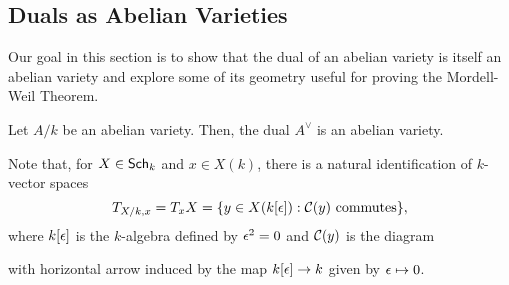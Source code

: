 \documentclass[11pt]{article}
\begin{document}
\subsection{Duals as Abelian Varieties}
Our goal in this section is to show that the dual of an abelian variety is itself an abelian variety and explore some of its geometry useful for proving the Mordell-Weil Theorem.

\begin{theorem}\label{Dual_Abelian_Thm}
Let $A/k$ be an abelian variety. Then, the dual $A^{\vee}$ is an abelian variety.
\end{theorem}

\begin{remark}
Note that, for $X\in\operatorname{\mathsf{Sch}}_k$ and $x\in X(k)$, there is a natural identification of $k$-vector spaces
$$T_{X/k,x}=T_{x}X=\{y\in X(k[\epsilon]) : \mathcal{C}(y)\textrm{ commutes}\},$$
where $k[\epsilon]$ is the $k$-algebra defined by $\epsilon^2=0$ and $\mathcal{C}(y)$ is the diagram
\begin{center}
\end{center}
with horizontal arrow induced by the map $k[\epsilon]\to k$ given by $\epsilon\mapsto0$.
\end{remark}
\end{document}
